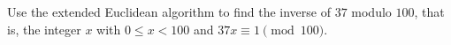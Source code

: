 Use the extended Euclidean algorithm to find the inverse of $37$ modulo $100$, that is, the integer $x$ with $0\le x<100$ and $37x\equiv1\pmod{100}$.
